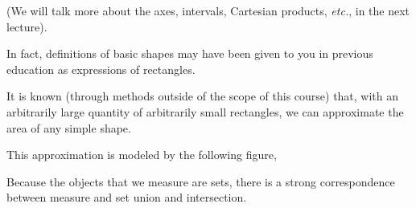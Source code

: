 \documentclass[letterpaper,twoside]{article}
\begin{document}
\begin{multicols*}{2}
(We will talk more about the axes, intervals, Cartesian products, \textit{etc.}, in the next lecture).

In fact, definitions of basic shapes may have been given to you in previous education as expressions of rectangles.

It is known (through methods outside of the scope of this course) that, with an arbitrarily large quantity of arbitrarily small rectangles, we can approximate the area of any simple shape.

This approximation is modeled by the following figure,

Because the objects that we measure are sets, there is a strong correspondence between measure and set union and intersection.



\hfill{}
\end{multicols*}
\end{document}
